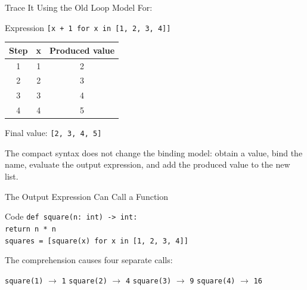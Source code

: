 \documentclass[aspectratio=169,10pt]{beamer}
\begin{document}
\begin{frame}[t]{Trace It Using the Old Loop Model}
  \small
  For:
  \begin{block}{Expression}
    \centering
    \texttt{[x + 1 for x in [1, 2, 3, 4]]}
  \end{block}

  \begin{center}
    \renewcommand{\arraystretch}{1.15}
    \begin{tabular}{c|c|c}
      \textbf{Step} & \textbf{x} & \textbf{Produced value} \\\hline
      1 & 1 & 2 \\
      2 & 2 & 3 \\
      3 & 3 & 4 \\
      4 & 4 & 5
    \end{tabular}
  \end{center}

  Final value: \texttt{[2, 3, 4, 5]}

  \begin{keyidea}
    The compact syntax does not change the binding model: obtain a value, bind the name, evaluate the output expression, and add the produced value to the new list.
  \end{keyidea}
\end{frame}

\begin{frame}{The Output Expression Can Call a Function}
  \begin{block}{Code}
    \texttt{def square(n: int) -> int:}\\
    \hspace{0.20in}\texttt{return n * n}\\[0.10in]
    \texttt{squares = [square(x) for x in [1, 2, 3, 4]]}
  \end{block}

  The comprehension causes four separate calls:

  \begin{center}
    \texttt{square(1)} $\rightarrow$ \texttt{1}\qquad
    \texttt{square(2)} $\rightarrow$ \texttt{4}\qquad
    \texttt{square(3)} $\rightarrow$ \texttt{9}\qquad
    \texttt{square(4)} $\rightarrow$ \texttt{16}
  \end{center}
\end{frame}
\end{document}
